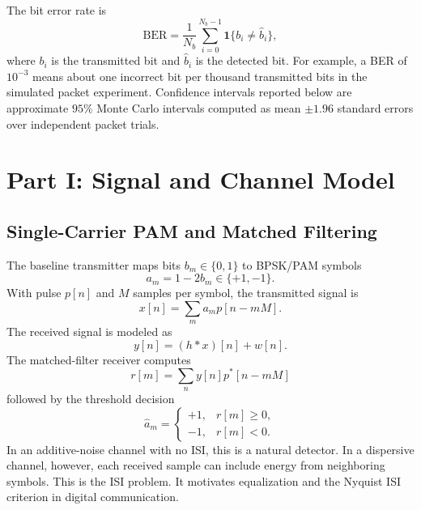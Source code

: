\documentclass[conference]{IEEEtran}
\begin{document}
The bit error rate is
\begin{equation}
    \mathrm{BER}=\frac{1}{N_b}\sum_{i=0}^{N_b-1}\mathbf{1}\{b_i\neq \hat{b}_i\},
\end{equation}
where $b_i$ is the transmitted bit and $\hat{b}_i$ is the detected bit. For example, a BER of $10^{-3}$ means about one incorrect bit per thousand transmitted bits in the simulated packet experiment. Confidence intervals reported below are approximate $95\%$ Monte Carlo intervals computed as mean $\pm 1.96$ standard errors over independent packet trials.

\section{Part I: Signal and Channel Model}

\subsection{Single-Carrier PAM and Matched Filtering}
The baseline transmitter maps bits $b_m\in\{0,1\}$ to BPSK/PAM symbols
\begin{equation}
    a_m = 1-2b_m \in \{+1,-1\}.
\end{equation}
With pulse $p[n]$ and $M$ samples per symbol, the transmitted signal is
\begin{equation}
    x[n] = \sum_m a_m p[n-mM].
\end{equation}
The received signal is modeled as
\begin{equation}
    y[n]=(h*x)[n]+w[n].
    \label{eq:channel}
\end{equation}
The matched-filter receiver computes
\begin{equation}
    r[m] = \sum_n y[n]p^*[n-mM]
\end{equation}
followed by the threshold decision
\begin{equation}
    \hat{a}_m =
    \begin{cases}
    +1, & r[m]\geq 0,\\
    -1, & r[m]<0.
    \end{cases}
\end{equation}
In an additive-noise channel with no ISI, this is a natural detector. In a dispersive channel, however, each received sample can include energy from neighboring symbols. This is the ISI problem. It motivates equalization and the Nyquist ISI criterion in digital communication.
\end{document}
